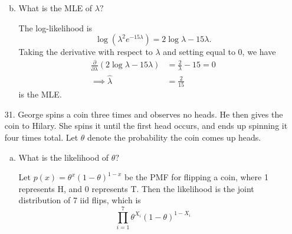 \documentclass{article}
\begin{document}
\begin{itemize}
\begin{enumerate}[a.]
\begin{soln}
				\end{soln}

			\item What is the MLE of $\lambda?$
				\begin{soln}
					The log-likelihood is \[\log\left( \lambda^2 e^{-15\lambda} \right)=2\log\lambda-15\lambda.\] Taking the derivative with respect to $\lambda$ and setting equal to 0, we have
					\begin{align*}
						\frac{\partial}{\partial\lambda}\left( 2\log \lambda-15\lambda \right) &= \frac{2}{\lambda}-15 = 0 \\
						\implies \hat{\lambda} &= \frac{2}{15}
					\end{align*} is the MLE.
					
				\end{soln}
				
		\end{enumerate}

	\item[31.] George spins a coin three times and observes no heads. He then gives the coin to Hilary. She spins it until the first head occurs, and ends up spinning it four times total. Let $\theta$ denote the probability the coin comes up heads.

		\begin{enumerate}[a.]
			\item What is the likelihood of $\theta?$
				\begin{soln}
					Let $p(x)=\theta^x (1-\theta)^{1-x}$ be the PMF for flipping a coin, where 1 represents H, and 0 represents T. Then the likelihood is the joint distribution of 7 iid flips, which is \[\prod_{i=1}^7 \theta^{X_i} (1-\theta)^{1-X_i}\]
					
				\end{soln}


\end{enumerate}
\end{itemize}
\end{document}

